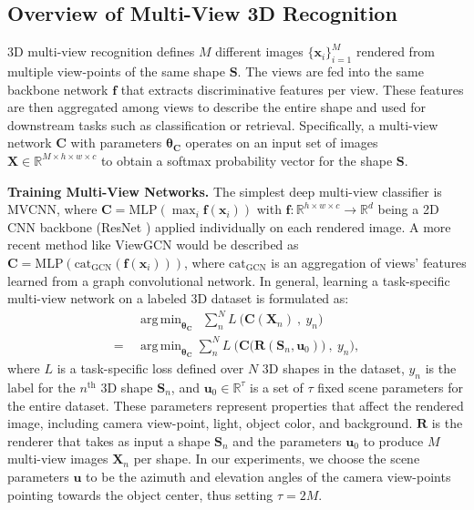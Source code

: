 \documentclass[10pt,twocolumn,letterpaper]{article}
\DeclareMathOperator*{\argmin}{arg\,min}
\newcommand{\mysection}[1]{\noindent\textbf{#1.}}
\begin{document}
\subsection{Overview of Multi-View 3D Recognition}
\vspace{-4pt}
3D multi-view recognition defines $M$ different images $\{\mathbf{x}_i\}_{i=1}^M$ rendered from multiple view-points of the same shape $\mathbf{S}$. The views are fed into the same backbone network $\mathbf{f}$ that extracts discriminative features per view. These features are then aggregated among views to describe the entire shape and used for downstream tasks such as classification or retrieval. 
Specifically, a multi-view network $\mathbf{C}$ with parameters $\boldsymbol{\theta}_{\mathbf{C}}$
operates on an input set of images $\mathbf{X} \in \mathbb{R}^{M  \times h\times w \times c }$ to obtain a softmax probability vector for the shape $\mathbf{S}$.

\mysection{Training Multi-View Networks}
The simplest deep multi-view classifier is MVCNN, where $\mathbf{C} = \text{MLP}\left( \max_{i} \mathbf{f}(\mathbf{x}_i)\right) $ with $\mathbf{f} : \mathbb{R}^{h \times w \times c} \rightarrow{\mathbb{R}^{d}}$ being a 2D CNN backbone (\eg ResNet \cite{resnet}) applied individually on each rendered image. A more recent method like ViewGCN would be described as $\mathbf{C} = \text{MLP}\left( \text{cat}_{\text{GCN}}\left( \mathbf{f}(\mathbf{x}_i)\right)\right) $, where $\text{cat}_{\text{GCN}}$ is an aggregation of views' features learned from a graph convolutional network. In general, learning a task-specific multi-view network on a labeled 3D dataset is formulated as:
\begin{equation}
\begin{aligned} 
 &\argmin_{\boldsymbol{\theta}_{\mathbf{C}}}~~ \sum_{n}^{N} L~\big( \mathbf{C} (\mathbf{X}_n)~,~y_n \big) \\ =~
 &\argmin_{\boldsymbol{\theta}_{\mathbf{C}}} \sum_{n}^{N} L~\Big( \mathbf{C} \big(\mathbf{R}(\mathbf{S}_n,\mathbf{u}_0)\big)~,~y_n \Big),
\label{eq:mv-objectiive}
\end{aligned} 
\end{equation}
\noindent where $L$ is a task-specific loss defined over $N$ 3D shapes in the dataset,
$y_n$ is the label for the $n^{\text{th}}$ 3D shape $\mathbf{S}_n$, and $\mathbf{u}_0 \in \mathbb{R}^{\tau}$ is a set of $\tau$ fixed scene parameters for the entire dataset. These parameters represent properties that affect the rendered image, including camera view-point, light, object color, and background. $\mathbf{R}$ is the renderer that takes as input a shape $\mathbf{S}_n$ and the parameters $\mathbf{u}_0$ to produce $M$ multi-view images $\mathbf{X}_n$ per shape. 
In our experiments, we choose the scene parameters $\mathbf{u}$ to be the azimuth and elevation angles of the camera view-points pointing towards the object center, thus setting $\tau = 2M$.
\end{document}
